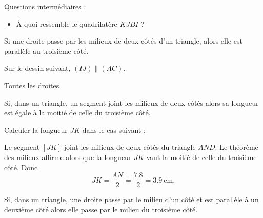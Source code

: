 



\vspace{2cm}

Questions intermédiaires : 
\begin{itemize}
    \item  À quoi ressemble le quadrilatère \( KJBI\) ?
\end{itemize}

\begin{theorem}
    Si une droite passe par les milieux de deux côtés d'un triangle, alors elle est parallèle au troisième côté.
\end{theorem}

Sur le dessin suivant, \( (IJ)\parallel (AC)\).
\begin{center}
   
\end{center}

Toutes les droites.
\begin{center}
   
\end{center}

\begin{theorem}
Si, dans un triangle, un segment joint les milieux de deux côtés alors sa longueur est égale à la moitié de celle du troisième côté.
\end{theorem}

\begin{example}
    Calculer la longueur \( JK\) dans le cas suivant :
\begin{center}
   
\end{center}
\end{example}

Le segment \( [JK]\) joint les milieux de deux côtés du triangle \( AND\). Le théorème des milieux affirme alors que la longueur \( JK\) vaut la moitié de celle du troisième côté. Donc
\begin{equation}
    JK=\frac{ AN }{2}=\frac{ 7.8 }{ 2 }=\SI{3.9}{\centi\meter}.
\end{equation}



\begin{theorem}
    Si, dans un triangle, une droite passe par le milieu d'un côté et est parallèle à un deuxième côté alors elle passe par le milieu du troisième côté.
\end{theorem}

